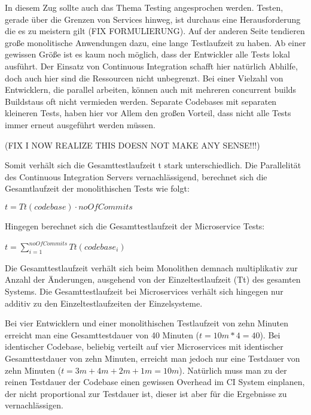 In diesem Zug sollte auch das Thema Testing angesprochen werden. Testen, gerade über die Grenzen von Services hinweg, ist durchaus eine Herausforderung die es zu meistern gilt (FIX FORMULIERUNG). Auf der anderen Seite tendieren große monolitische Anwendungen dazu, eine lange Testlaufzeit zu haben. Ab einer gewissen Größe ist es kaum noch möglich, dass der Entwickler alle Tests lokal ausführt. Der Einsatz von Continuous Integration schafft hier natürlich Abhilfe, doch auch hier sind die Ressourcen nicht unbegrenzt. Bei einer Vielzahl von Entwicklern, die parallel arbeiten, können auch mit mehreren concurrent builds Buildstaus oft nicht vermieden werden. Separate Codebases mit separaten kleineren Tests, haben hier vor Allem den großen Vorteil, dass nicht alle Tests immer erneut ausgeführt werden müssen.

(FIX I NOW REALIZE THIS DOESN NOT MAKE ANY SENSE!!!)

Somit verhält sich die Gesamttestlaufzeit t stark unterschiedlich. Die Parallelität des Continuous Integration Servers vernachlässigend, berechnet sich die Gesamtlaufzeit der monolithischen Tests wie folgt:

$ t = Tt(codebase) \cdot noOfCommits $

Hingegen berechnet sich die Gesamttestlaufzeit der Microservice Tests:

$ t = \displaystyle\sum_{i=1}^{noOfCommits} Tt(codebase_i) $

Die Gesamttestlaufzeit verhält sich beim Monolithen demnach multiplikativ zur Anzahl der Änderungen, ausgehend von der Einzeltestlaufzeit (Tt) des gesamten Systems. Die Gesamttestlaufzeit bei Microservices verhält sich hingegen nur additiv zu den Einzeltestlaufzeiten der Einzelsysteme.

Bei vier Entwicklern und einer monolithischen Testlaufzeit von zehn Minuten erreicht man eine Gesamttestdauer von 40 Minuten ($ t = 10m * 4 = 40 $). Bei identischer Codebase, beliebig verteilt auf vier Microservices mit identischer Gesamttestdauer von zehn Minuten, erreicht man jedoch nur eine Testdauer von zehn Minuten ($ t = 3m + 4m + 2m + 1m = 10m $).
Natürlich muss man zu der reinen Testdauer der Codebase einen gewissen Overhead im CI System einplanen, der nicht proportional zur Testdauer ist, dieser ist aber für die Ergebnisse zu vernachlässigen.

